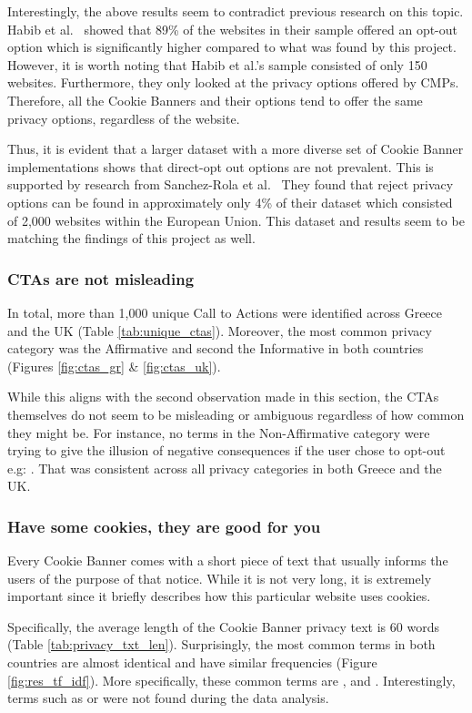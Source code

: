 \documentclass[../main.tex]{subfiles}
\begin{document}
Interestingly, the above results seem to contradict previous research on this topic. Habib et al.~\cite{habib2019empirical} showed that 89\% of the websites in their sample offered an opt-out option which is significantly higher compared to what was found by this project. However, it is worth noting that Habib et al.’s sample consisted of only 150 websites. Furthermore, they only looked at the privacy options offered by CMPs. Therefore, all the Cookie Banners and their options tend to offer the same privacy options, regardless of the website. 

Thus, it is evident that a larger dataset with a more diverse set of Cookie Banner implementations shows that direct-opt out options are not prevalent. This is supported by research from Sanchez-Rola et al.~\cite{sanchez2019can} They found that reject privacy options can be found in approximately only 4\% of their dataset which consisted of 2,000 websites within the European Union. This dataset and results seem to be matching the findings of this project as well. 

\subsubsection{CTAs are not misleading}
In total, more than 1,000 unique Call to Actions were identified across Greece and the UK (Table \ref{tab:unique_ctas}). Moreover, the most common privacy category was the Affirmative and second the Informative in both countries (Figures \ref{fig:ctas_gr} \& \ref{fig:ctas_uk}).

While this aligns with the second observation made in this section, the CTAs themselves do not seem to be misleading or ambiguous regardless of how common they might be. For instance, no terms in the Non-Affirmative category were trying to give the illusion of negative consequences if the user chose to opt-out e.g: . That was consistent across all privacy categories in both Greece and the UK. 

\subsubsection{Have some cookies, they are good for you}
Every Cookie Banner comes with a short piece of text that usually informs the users of the purpose of that notice. While it is not very long, it is extremely important since it briefly describes how this particular website uses cookies. 

Specifically, the average length of the Cookie Banner privacy text is 60 words (Table \ref{tab:privacy_txt_len}). Surprisingly, the most common terms in both countries are almost identical and have similar frequencies (Figure \ref{fig:res_tf_idf}). More specifically, these common terms are ,  and . Interestingly, terms such as  or  were not found during the data analysis. 
\end{document}
